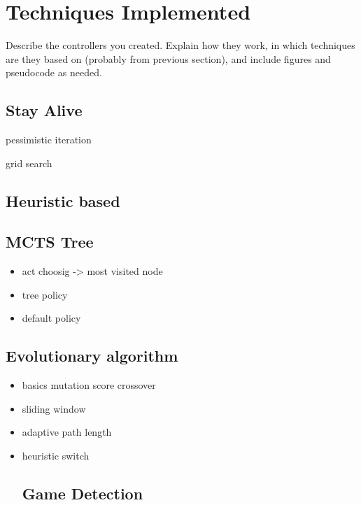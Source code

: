 \section{Techniques Implemented} \label{sec:exp}

Describe the controllers you created. Explain how they work, in which techniques are they based on (probably from previous section), and include figures and pseudocode as needed.


\subsection{Stay Alive} 

pessimistic iteration

grid search



\subsection{Heuristic based} 
 



\subsection{MCTS Tree} 

\begin{itemize}
  \item act choosig -> most visited node
  \item tree policy
  \item default policy
\end{itemize}



\subsection{Evolutionary algorithm} 

\begin{itemize}
  \item basics mutation score crossover
  \item sliding window
  \item adaptive path length
  \item heuristic switch
  
  
\subsection{Game Detection} 
  
  
\end{itemize}